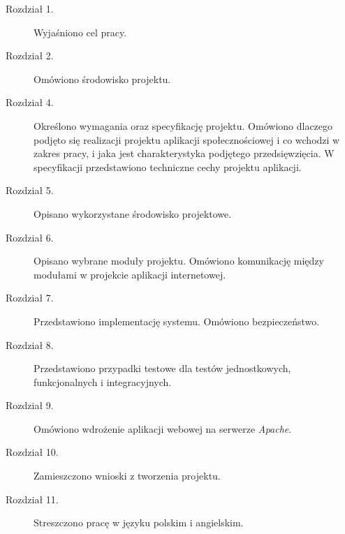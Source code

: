 \begin{description}
\item[Rozdział 1.] 
Wyjaśniono cel pracy.
\item[Rozdział 2.] 
Omówiono środowisko projektu.
\item[Rozdział 4.] 
Określono wymagania oraz specyfikację projektu. Omówiono dlaczego podjęto się realizacji projektu aplikacji społecznościowej i co wchodzi w zakres pracy, 
i jaka jest charakterystyka podjętego przedsięwzięcia. W specyfikacji przedstawiono techniczne cechy projektu aplikacji.
\item[Rozdział 5.] 
Opisano wykorzystane środowisko projektowe.
\item[Rozdział 6.] 
Opisano wybrane moduły projektu. Omówiono komunikację między modułami w projekcie aplikacji internetowej.
\item[Rozdział 7.] 
Przedstawiono implementację systemu. Omówiono bezpieczeństwo.
\item[Rozdział 8.] 
Przedstawiono przypadki testowe dla testów jednostkowych, funkcjonalnych i integracyjnych.
\item[Rozdział 9.] 
Omówiono wdrożenie aplikacji webowej na serwerze \emph{Apache}.
\item[Rozdział 10.] 
Zamieszczono wnioski z tworzenia projektu.
\item[Rozdział 11.] 
Streszczono pracę w języku polskim i angielskim.
\end{description}